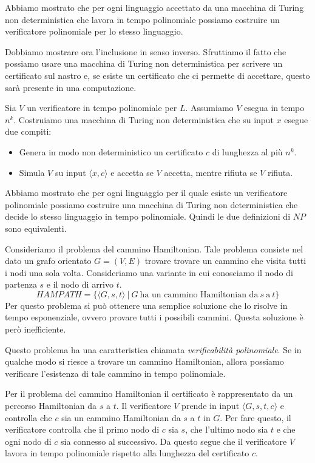 Abbiamo mostrato che per ogni linguaggio accettato da una macchina di Turing non
deterministica che lavora in tempo polinomiale possiamo costruire un verificatore
polinomiale per lo stesso linguaggio.

Dobbiamo mostrare ora l'inclusione in senso inverso. Sfruttiamo il fatto che
possiamo usare una macchina di Turing non deterministica per scrivere un
certificato sul nastro e, se esiste un certificato che ci permette di accettare,
questo sarà presente in una computazione.

Sia $V$ un verificatore in tempo polinomiale per $L$. Assumiamo $V$ esegua in
tempo $n^k$. Costruiamo una macchina di Turing non deterministica che su input
$x$ esegue due compiti:
\begin{itemize}
    \item Genera in modo non deterministico un certificato $c$ di lunghezza al
          più $n^k$.
    \item Simula $V$ su input $\langle x, c \rangle$ e accetta se $V$ accetta,
          mentre rifiuta se $V$ rifiuta.
\end{itemize}
Abbiamo mostrato che per ogni linguaggio per il quale esiste un verificatore
polinomiale possiamo costruire una macchina di Turing non deterministica che
decide lo stesso linguaggio in tempo polinomiale. Quindi le due definizioni di
$NP$ sono equivalenti.
\begin{esempio}
    Consideriamo il problema del cammino Hamiltonian. Tale problema consiste nel
    dato un grafo orientato $G = (V, E)$ trovare trovare un cammino che visita
    tutti i nodi una sola volta. Consideriamo una variante in cui conosciamo il
    nodo di partenza $s$ e il nodo di arrivo $t$.
    \begin{equation}
        HAMPATH = \{\langle G, s, t \rangle \ | \ G \ \text{ha un cammino
            Hamiltonian da} \ s \ \text{a} \ t\}
    \end{equation}
    Per questo problema si può ottenere una semplice soluzione che lo risolve in
    tempo esponenziale, ovvero provare tutti i possibili cammini. Questa
    soluzione è però inefficiente.

    Questo problema ha una caratteristica chiamata \textit{verificabilità
        polinomiale}. Se in qualche modo si riesce a trovare un cammino
    Hamiltonian, allora possiamo verificare l'esistenza di tale cammino in tempo
    polinomiale.

    Per il problema del cammino Hamiltonian il certificato è rappresentato da
    un percorso Hamiltonian da $s$ a $t$. Il verificatore $V$ prende in input
    $\langle G, s, t, c \rangle$ e controlla che $c$ sia un cammino Hamiltonian
    da $s$ a $t$ in $G$. Per fare questo, il verificatore controlla che il primo
    nodo di $c$ sia $s$, che l'ultimo nodo sia $t$ e che ogni nodo di $c$ sia
    connesso al successivo.
    Da questo segue che il verificatore $V$ lavora in tempo polinomiale rispetto
    alla lunghezza del certificato $c$.
\end{esempio}

